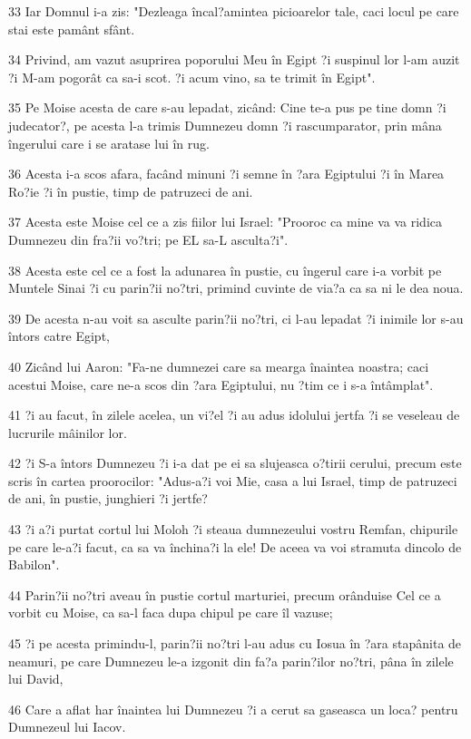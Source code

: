 \par 33 Iar Domnul i-a zis: "Dezleaga încal?amintea picioarelor tale, caci locul pe care stai este pamânt sfânt.
\par 34 Privind, am vazut asuprirea poporului Meu în Egipt ?i suspinul lor l-am auzit ?i M-am pogorât ca sa-i scot. ?i acum vino, sa te trimit în Egipt".
\par 35 Pe Moise acesta de care s-au lepadat, zicând: Cine te-a pus pe tine domn ?i judecator?, pe acesta l-a trimis Dumnezeu domn ?i rascumparator, prin mâna îngerului care i se aratase lui în rug.
\par 36 Acesta i-a scos afara, facând minuni ?i semne în ?ara Egiptului ?i în Marea Ro?ie ?i în pustie, timp de patruzeci de ani.
\par 37 Acesta este Moise cel ce a zis fiilor lui Israel: "Prooroc ca mine va va ridica Dumnezeu din fra?ii vo?tri; pe EL sa-L asculta?i".
\par 38 Acesta este cel ce a fost la adunarea în pustie, cu îngerul care i-a vorbit pe Muntele Sinai ?i cu parin?ii no?tri, primind cuvinte de via?a ca sa ni le dea noua.
\par 39 De acesta n-au voit sa asculte parin?ii no?tri, ci l-au lepadat ?i inimile lor s-au întors catre Egipt,
\par 40 Zicând lui Aaron: "Fa-ne dumnezei care sa mearga înaintea noastra; caci acestui Moise, care ne-a scos din ?ara Egiptului, nu ?tim ce i s-a întâmplat".
\par 41 ?i au facut, în zilele acelea, un vi?el ?i au adus idolului jertfa ?i se veseleau de lucrurile mâinilor lor.
\par 42 ?i S-a întors Dumnezeu ?i i-a dat pe ei sa slujeasca o?tirii cerului, precum este scris în cartea proorocilor: "Adus-a?i voi Mie, casa a lui Israel, timp de patruzeci de ani, în pustie, junghieri ?i jertfe?
\par 43 ?i a?i purtat cortul lui Moloh ?i steaua dumnezeului vostru Remfan, chipurile pe care le-a?i facut, ca sa va închina?i la ele! De aceea va voi stramuta dincolo de Babilon".
\par 44 Parin?ii no?tri aveau în pustie cortul marturiei, precum orânduise Cel ce a vorbit cu Moise, ca sa-l faca dupa chipul pe care îl vazuse;
\par 45 ?i pe acesta primindu-l, parin?ii no?tri l-au adus cu Iosua în ?ara stapânita de neamuri, pe care Dumnezeu le-a izgonit din fa?a parin?ilor no?tri, pâna în zilele lui David,
\par 46 Care a aflat har înaintea lui Dumnezeu ?i a cerut sa gaseasca un loca? pentru Dumnezeul lui Iacov.
